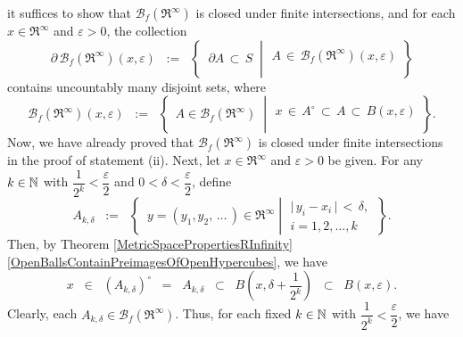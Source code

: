 \begin{enumerate}
	it suffices to show that $\mathcal{B}_{f}(\Re^{\infty})$ is closed under finite intersections, and
	for each $x \in \Re^{\infty}$ and $\varepsilon > 0$, the collection
	\begin{equation*}
	\partial\,\mathcal{B}_{f}(\Re^{\infty})(x,\varepsilon)
	\;\; := \;\;
	\left\{\;\;
	\partial A \,\subset\, S
	\;\;\left\vert\;
	\begin{array}{c}
		\\
		A \,\in\, \mathcal{B}_{f}(\Re^{\infty})(x,\varepsilon)
		\\ \\
	\end{array}
	\right.
	\right\}
	\end{equation*}
	contains uncountably many disjoint sets,
	where
	\begin{equation*}
	\mathcal{B}_{f}(\Re^{\infty})(x,\varepsilon)
	\;\; := \;\;
	\left\{\;\,
	A \in \mathcal{B}_{f}(\Re^{\infty})
	\;\;\left\vert\;
	\begin{array}{c}
		\\
		x \,\in\, A^{\circ} \,\subset\, A \,\subset\, B(x,\varepsilon)
		\\ \\
	\end{array}
	\right.
	\right\}.
	\end{equation*}
	Now, we have already proved that $\mathcal{B}_{f}(\Re^{\infty})$ is closed under finite intersections
	in the proof of statement (ii).
	Next, let $x \in \Re^{\infty}$ and $\varepsilon > 0$ be given.
	For any $k \in \mathbb{N}$ with $\dfrac{1}{2^{k}} < \dfrac{\varepsilon}{2}$ and
	$0 < \delta < \dfrac{\varepsilon}{2}$, define
	\begin{equation*}
	A_{k,\delta} \;\; := \;\;
	\left\{\;\;
	y = (y_{1},y_{2},\,\ldots\,) \in \Re^{\infty}
	\;\left\vert\;
	\begin{array}{c}
		\vert\,y_{i} - x_{i}\,\vert \, < \, \delta,
		\\
		i = 1, 2, \ldots, k
	\end{array}
	\right.
	\,\right\}.
	\end{equation*}
	Then, by Theorem \ref{MetricSpacePropertiesRInfinity}\eqref{OpenBallsContainPreimagesOfOpenHypercubes},
	we have
	\begin{equation*}
	x \;\; \in \;\; (A_{k,\delta})^{\circ}
	\;\; = \;\; A_{k,\delta}
	\;\; \subset \;\; B\!\left(x,\delta+\dfrac{1}{2^{k}}\right)
	\;\; \subset \;\; B(x,\varepsilon).
	\end{equation*}
	Clearly, each $A_{k,\delta} \in \mathcal{B}_{f}(\Re^{\infty})$.
	Thus, for each fixed $k \in \mathbb{N}$ with $\dfrac{1}{2^{k}} < \dfrac{\varepsilon}{2}$, we have

\end{enumerate}
